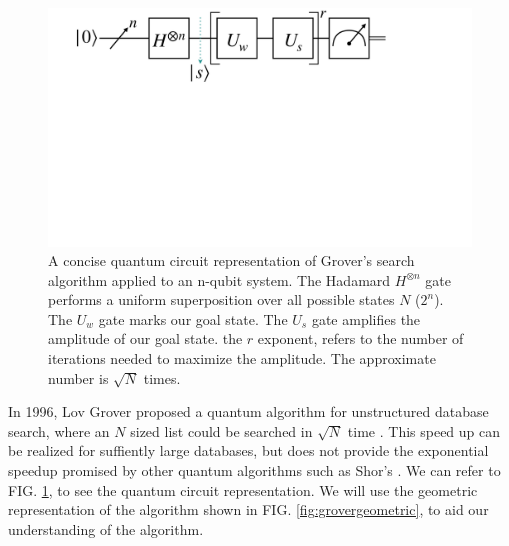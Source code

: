 \documentclass[twocolumn,showpacs,preprintnumbers,amsmath,amssymb]{revtex4}
\begin{document}
		\begin{figure}[!h]
			\centering
			\includegraphics[trim={4.5cm 26cm 15cm 0},clip, width=0.99 \linewidth]{"graphics/grov_circ"}
			\caption{A concise quantum circuit representation of Grover's search algorithm applied to an n-qubit system. The Hadamard $H^{\otimes n }$ gate performs a uniform superposition over all possible states $N$ ($2^n$). The $U_w$ gate marks our goal state. The $U_s$ gate amplifies the amplitude of our goal state. the $r$ exponent, refers to the number of iterations needed to maximize the amplitude. The approximate number is $\sqrt{N}$ times.}
			\label{fig:grovercircuit}
		\end{figure}
		
		In 1996, Lov Grover proposed a quantum algorithm for unstructured database search, where an $N$ sized list could be searched in $\sqrt{N}$ time \cite{grover1996fast}. This speed up can be realized for suffiently large databases, but does not provide the exponential speedup promised by other quantum algorithms such as Shor's \cite{Shor}. We can refer to FIG. \ref{fig:grovercircuit}, to see the quantum circuit representation. We will use the geometric representation of the algorithm shown in FIG. \ref{fig:grovergeometric}, to aid our understanding of the algorithm.  
		
\end{document}
